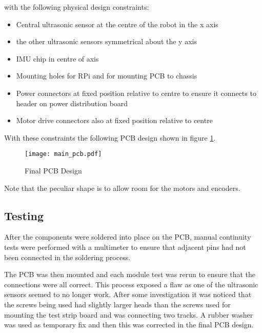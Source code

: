with the following physical design constraints:

\begin{itemize}
  \item Central ultrasonic sensor at the centre of the robot in the x axis
  \item the other ultrasonic sensors symmetrical about the y axis
  \item IMU chip in centre of axis
  \item Mounting holes for RPi and for mounting PCB to chassis
  \item Power connectors at fixed position relative to centre to ensure it connects to header on power distribution board
  \item Motor drive connectors also at fixed position relative to centre
\end{itemize}



With these constraints the following PCB design shown in figure \ref{PCB_Design}.

\begin{figure}[!ht]
	\centering
	\texttt{[image: main\_pcb.pdf]}
	\caption{Final PCB Design}\label{PCB_Design}

\end{figure}
Note that the peculiar shape is to allow room for the motors and encoders.

\subsection{Testing}\label{elec/pcb/test}

After the components were soldered into place on the PCB, manual 
continuity tests were performed with a multimeter to ensure that adjacent 
pins had not been connected in the soldering process.

The PCB was then mounted and each module test was rerun to ensure that the 
connections were all correct. This process exposed a flaw as one of the 
ultrasonic sensors seemed to no longer work. After some investigation it 
was noticed that the screws being used had slightly larger heads than the 
screws used for mounting the test strip board and was connecting two 
tracks. A rubber washer was used as temporary fix and then this was 
corrected in the final PCB design.
